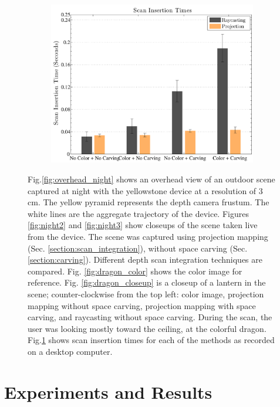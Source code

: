 \documentclass[10pt,twocolumn,letterpaper]{article}
\newcommand{\figref}[1]{Fig.\ref{#1}}
\begin{document}
\begin{figure} [htb]
\begin{subfigure}{0.35\linewidth}
\includegraphics[width=1.0\textwidth]{img/timing_data.pdf}
		 \caption{}
		 \label{fig:timing}
	 \end{subfigure} 
	 \caption{\figref{fig:overhead_night} shows an overhead view of
	 an outdoor scene captured at night with the yellowstone device at a
	 resolution of 3 cm. The yellow pyramid represents the depth camera frustum. The white
	 lines are the aggregate trajectory of the device. Figures \ref{fig:night2}
	 and \ref{fig:night3} show closeups of the scene taken live from the device.
	 The scene was captured using projection mapping (Sec.
	 \ref{section:scan_integration}), without space
	 carving (Sec. \ref{section:carving}). Different depth scan integration techniques are compared. Fig.
	 \ref{fig:dragon_color} shows the color image for reference.  Fig.
	 \ref{fig:dragon_closeup} is a closeup of a lantern in the scene; 
	 counter-clockwise from the top left: color image, projection mapping without
	 space carving, projection mapping with space carving, and raycasting without
	 space carving. During the scan, the user was looking mostly toward the
	 ceiling, at the colorful dragon. \figref{fig:timing} shows
      scan insertion times for each of the methods as recorded on a desktop
      computer.}
	 \label{fig:device_data}
 \end{figure} 


\section{Experiments and Results}
\label{section:experiments}
\end{document}
